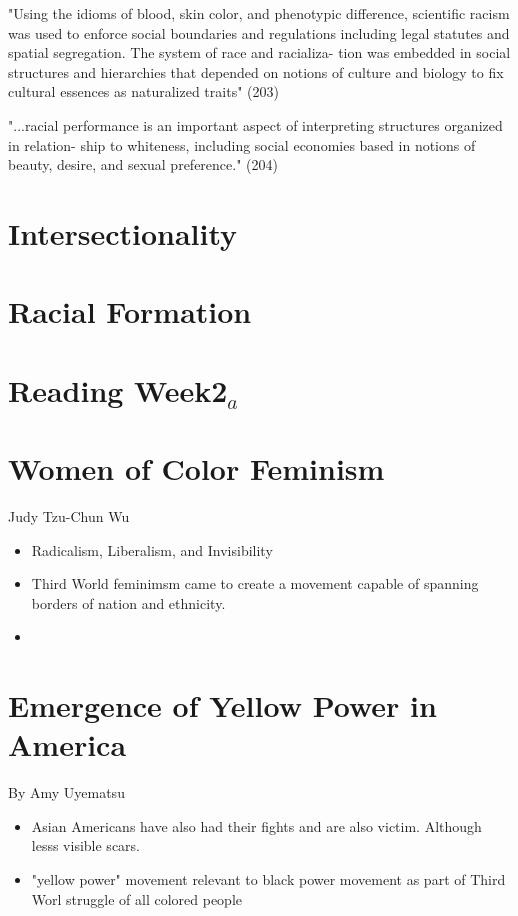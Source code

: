 \documentclass{article}
\begin{document}
"Using the idioms of blood, skin color, and phenotypic
difference, scientific racism was used to enforce social
boundaries and regulations including legal statutes and
spatial segregation. The system of race and racializa-
tion was embedded in social structures and hierarchies
that depended on notions of culture and biology to fix
cultural essences as naturalized traits" (203)

"...racial performance is an important
aspect of interpreting structures organized in relation-
ship to whiteness, including social economies based in
notions of beauty, desire, and sexual preference." (204)



\section{Intersectionality}

\section{Racial Formation}

\section*{Reading Week2$_{a}$}

\section{Women of Color Feminism}
Judy Tzu-Chun Wu
\begin{itemize}
  \item Radicalism, Liberalism, and Invisibility
  \item Third World feminimsm came to create a movement 
    capable of spanning borders of nation and ethnicity.
  \item 
\end{itemize}

\section{Emergence of Yellow Power in America}
By Amy Uyematsu
\begin{itemize}
  \item Asian Americans have also had their fights
    and are also victim. Although lesss visible scars.
  \item "yellow power" movement relevant to black power
    movement as part of Third Worl struggle of all colored people
\end{itemize}
\end{document}
